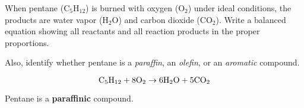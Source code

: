 

When pentane (C$_{5}$H$_{12}$) is burned with oxygen (O$_{2}$) under ideal conditions, the products are water vapor (H$_{2}$O) and carbon dioxide (CO$_{2}$).  Write a balanced equation showing all reactants and all reaction products in the proper proportions.

\vskip 50pt

Also, identify whether pentane is a {\it paraffin}, an {\it olefin}, or an {\it aromatic} compound.







$$\hbox{C}_5\hbox{H}_{12} + \hbox{8O}_2 \to \hbox{6H}_2\hbox{O} + \hbox{5CO}_2$$

\vskip 10pt

Pentane is a {\bf paraffinic} compound.











